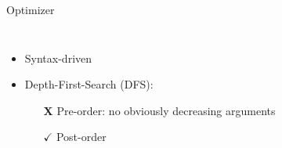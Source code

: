 \documentclass[aspectratio=169,xcolor=dvipsnames]{beamer}
\begin{document}
    \begin{frame}{Optimizer}
        \begin{columns}
             \begin{itemize}
                \item Syntax-driven
                \item Depth-First-Search (DFS):
                \begin{itemize}
                    \item[\textbf{X}] Pre-order: no obviously decreasing arguments
                    \item[$\checkmark$] \alert{Post-order}
                \end{itemize}
            \end{itemize}
            \begin{minipage}[t][\textheight][t]{\textwidth}

\end{minipage}
\end{columns}
\end{frame}
\end{document}

